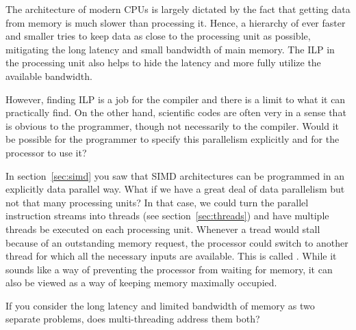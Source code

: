 
The architecture of modern CPUs is largely dictated by the fact that
getting data from memory is much slower than processing it. Hence, a
hierarchy of ever faster and smaller tries to keep data as close to
the processing unit as possible, mitigating the long latency and small
bandwidth of main memory. The \ac{ILP} in the processing unit 
also helps to hide the latency and more fully utilize the available
bandwidth. 

However, finding \ac{ILP} is a job for the compiler and
there is a limit to what it can practically find. On the other hand,
scientific codes are often very  in a sense
that is obvious to the programmer, though not necessarily to the
compiler. Would it be possible for the programmer to specify this
parallelism explicitly and for the processor to use it?

In section~\ref{sec:simd} you saw that \ac{SIMD} architectures can be
programmed in an explicitly data parallel way. What if we have a great
deal of data parallelism but not that many processing units? In that
case, we could turn the parallel instruction streams into threads (see
section~\ref{sec:threads}) and have multiple threads be executed on
each processing unit. Whenever a tread would stall because of an
outstanding memory request, the processor could switch to another
thread for which all the necessary inputs are available. This is
called . While it sounds like a way of
preventing the processor from waiting for memory, it can also be
viewed as a way of keeping memory maximally occupied.

\begin{exercise}
  If you consider the long latency and limited bandwidth of memory as
  two separate problems, does multi-threading address them both?
\end{exercise}

